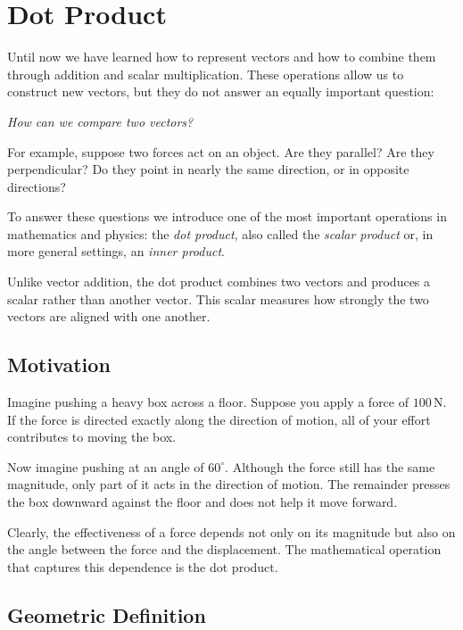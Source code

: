 \section{Dot Product}
\label{sec:dot-product}

Until now we have learned how to represent vectors and how to combine them through
addition and scalar multiplication. These operations allow us to construct new
vectors, but they do not answer an equally important question:

\begin{center}
\emph{How can we compare two vectors?}
\end{center}

For example, suppose two forces act on an object. Are they parallel? Are they
perpendicular? Do they point in nearly the same direction, or in opposite
directions?

To answer these questions we introduce one of the most important operations in
mathematics and physics: the \emph{dot product}, also called the \emph{scalar
product} or, in more general settings, an \emph{inner product}.

Unlike vector addition, the dot product combines two vectors and produces a
scalar rather than another vector. This scalar measures how strongly the two
vectors are aligned with one another.

\subsection{Motivation}

Imagine pushing a heavy box across a floor. Suppose you apply a force of
$100\,\mathrm{N}$. If the force is directed exactly along the direction of
motion, all of your effort contributes to moving the box.

Now imagine pushing at an angle of $60^{\circ}$. Although the force still has
the same magnitude, only part of it acts in the direction of motion. The
remainder presses the box downward against the floor and does not help it move
forward.

Clearly, the effectiveness of a force depends not only on its magnitude but
also on the angle between the force and the displacement. The mathematical
operation that captures this dependence is the dot product.

\subsection{Geometric Definition}

